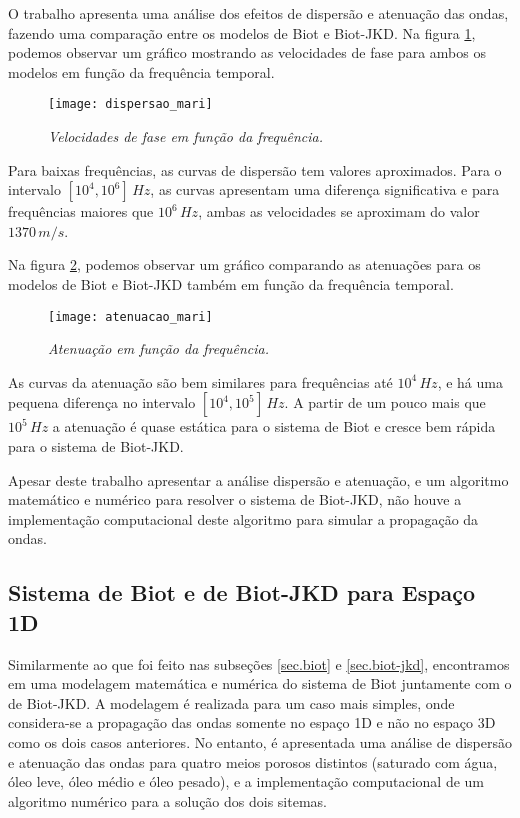 O trabalho apresenta uma an\'alise dos efeitos de dispers\~ao e atenua\c{c}\~ao das ondas, fazendo uma compara\c{c}\~ao entre os modelos de Biot e Biot-JKD. Na figura \ref{fig.dispersao_mari}, podemos observar um gr\'afico mostrando as velocidades de fase para ambos os modelos em fun\c{c}\~ao da frequ\^encia temporal.
\begin{figure}
\centering
\texttt{[image: dispersao\_mari]}
\caption{\textit{Velocidades de fase em fun\c{c}\~ao da frequ\^encia.}}
\label{fig.dispersao_mari}
\end{figure} 
Para baixas frequ\^encias, as curvas de dispers\~ao tem valores aproximados. Para o intervalo $[10^4,10^6]\,Hz$, as curvas apresentam uma diferen\c{c}a significativa e para frequ\^encias maiores que $10^6\,Hz$, ambas as velocidades se aproximam do valor $1370\,m/s$.


Na figura \ref{fig.atenuacao_mari}, podemos observar um gr\'afico comparando as atenua\c{c}\~oes para os modelos de Biot e Biot-JKD tamb\'em em fun\c{c}\~ao da frequ\^encia temporal.
\begin{figure}
\centering
\texttt{[image: atenuacao\_mari]}
\caption{\textit{Atenua\c{c}\~ao em fun\c{c}\~ao da frequ\^encia.}}
\label{fig.atenuacao_mari}
\end{figure}
As curvas da atenua\c{c}\~ao s\~ao bem similares para frequ\^encias at\'e $10^4\,Hz$, e h\'a uma pequena diferen\c{c}a no intervalo $[10^4,10^5]\,Hz$. A partir de um pouco mais que $10^5\,Hz$ a atenua\c{c}\~ao \'e quase est\'atica para o sistema de Biot e cresce bem r\'apida para o sistema de Biot-JKD.

Apesar deste trabalho apresentar a an\'alise dispers\~ao e atenua\c{c}\~ao, e um algoritmo matem\'atico e num\'erico para resolver o sistema de Biot-JKD, n\~ao houve a implementa\c{c}\~ao computacional deste algoritmo para simular a propaga\c{c}\~ao da ondas.

\subsection{Sistema de Biot e de Biot-JKD para Espa\c{c}o 1D}
Similarmente ao que foi feito nas subse\c{c}\~oes \ref{sec.biot} e \ref{sec.biot-jkd}, encontramos em \cite{oliveira_2018} uma modelagem matem\'atica e num\'erica do sistema de Biot juntamente com o de Biot-JKD. A modelagem \'e realizada para um caso mais simples, onde considera-se a propaga\c{c}\~ao das ondas somente no espa\c{c}o 1D e n\~ao no espa\c{c}o 3D como os dois casos anteriores. No entanto, \'e apresentada uma an\'alise de dispers\~ao e atenua\c{c}\~ao das ondas para quatro meios porosos distintos (saturado com \'agua, \'oleo leve, \'oleo m\'edio e \'oleo pesado), e a implementa\c{c}\~ao computacional de um algoritmo num\'erico para a solu\c{c}\~ao dos dois sitemas.

